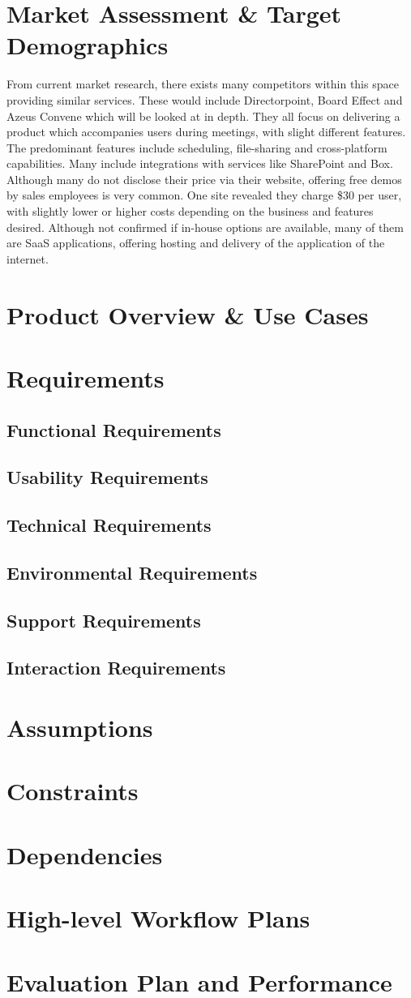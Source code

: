 \documentclass[11pt, oneside]{article}
\begin{document}
\section{Market Assessment \& Target Demographics}
From current market research, there exists many competitors within this space providing similar services.  These would include Directorpoint, Board Effect and Azeus Convene which will be looked at in depth. They all focus on delivering a product which accompanies users during meetings, with slight different features. The predominant features include scheduling, file-sharing and cross-platform capabilities. Many include integrations with services like SharePoint and Box. Although many do not disclose their price via their website, offering free demos by sales employees is very common. One site revealed they charge \$30 per user, with slightly lower or higher costs depending on the business and features desired. Although not confirmed if in-house options are available, many of them are SaaS applications, offering hosting and delivery of the application of the internet. 
\section{Product Overview \& Use Cases}
\section{Requirements}
\subsection{Functional Requirements}
\subsection{Usability Requirements}
\subsection{Technical Requirements}
\subsection{Environmental Requirements}
\subsection{Support Requirements}
\subsection{Interaction Requirements}
\section{Assumptions}
\section{Constraints}
\section{Dependencies}
\section{High-level Workflow Plans}
\section{Evaluation Plan and Performance}
\end{document}
